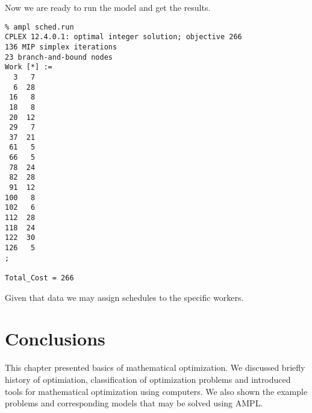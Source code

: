 Now we are ready to run the model and get the results.

\begin{lstlisting}
% ampl sched.run
CPLEX 12.4.0.1: optimal integer solution; objective 266
136 MIP simplex iterations
23 branch-and-bound nodes
Work [*] :=
  3   7
  6  28
 16   8
 18   8
 20  12
 29   7
 37  21
 61   5
 66   5
 78  24
 82  28
 91  12
100   8
102   6
112  28
118  24
122  30
126   5
;

Total_Cost = 266
\end{lstlisting}

Given that data we may assign schedules to the specific workers.

\section{Conclusions}

This chapter presented basics of mathematical optimization. We discussed briefly history of optimiation, classification of optimization problems and introduced tools for mathematical optimization using computers. We also shown the example problems and corresponding models that may be solved using AMPL.
